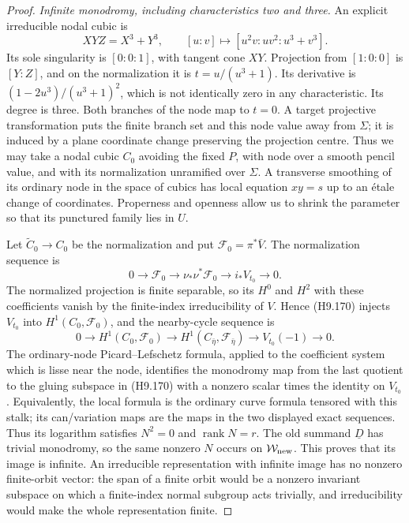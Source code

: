 \begin{proof}
\emph{Infinite monodromy, including characteristics two and three.}
An explicit irreducible nodal cubic is
\[
 XYZ=X^3+Y^3,\qquad
 [u:v]\longmapsto[u^2v:uv^2:u^3+v^3].
                                                               \tag{H9.169}
\]
Its sole singularity is $[0:0:1]$, with tangent cone $XY$.
Projection from $[1:0:0]$ is $[Y:Z]$, and on the
normalization it is $t=u/(u^3+1)$. Its derivative is
$(1-2u^3)/(u^3+1)^2$, which is not identically zero in any
characteristic. Its degree is three. Both branches of the
node map to $t=0$. A target projective transformation puts
the finite branch set and this node value away from $\Sigma$;
it is induced by a plane coordinate change preserving the
projection centre. Thus we may take a nodal cubic $C_0$
avoiding the fixed $P$, with node over a smooth pencil value,
and with its normalization unramified over $\Sigma$.
A transverse smoothing of its ordinary node in the space
of cubics has local equation $xy=s$ up to an \'etale change
of coordinates. Properness and openness allow us to shrink
the parameter so that its punctured family lies in $U$.

Let $\widetilde C_0\to C_0$ be the normalization and put
$\mathcal F_0=\pi^*\bar V$. The normalization sequence is
\[
 0\to\mathcal F_0\to\nu_*\nu^*\mathcal F_0
                       \to i_*V_{t_0}\to0.
                                                               \tag{H9.170}
\]
The normalized projection is finite separable, so its
$H^0$ and $H^2$ with these coefficients vanish by the
finite-index irreducibility of $V$. Hence (H9.170) injects
$V_{t_0}$ into $H^1(C_0,\mathcal F_0)$, and the
nearby-cycle sequence is
\[
 0\to H^1(C_0,\mathcal F_0)
  \to H^1(C_{\bar\eta},\mathcal F_{\bar\eta})
  \to V_{t_0}(-1)\to0.
                                                               \tag{H9.171}
\]
The ordinary-node Picard--Lefschetz formula, applied to
the coefficient system which is lisse near the node,
identifies the monodromy map from the last quotient to
the gluing subspace in (H9.170) with a nonzero scalar
times the identity on $V_{t_0}$. Equivalently, the local
formula is the ordinary curve formula tensored with this
stalk; its can/variation maps are the maps in the two
displayed exact sequences. Thus its logarithm satisfies
$N^2=0$ and $\operatorname{rank}N=r$. The old summand
$\underline D$ has trivial monodromy, so the same nonzero
$N$ occurs on $\mathcal W_{\rm new}$.
This proves that its image is infinite. An irreducible
representation with infinite image has no nonzero
finite-orbit vector: the span of a finite orbit would be
a nonzero invariant subspace on which a finite-index
normal subgroup acts trivially, and irreducibility would
make the whole representation finite.


\end{proof}
